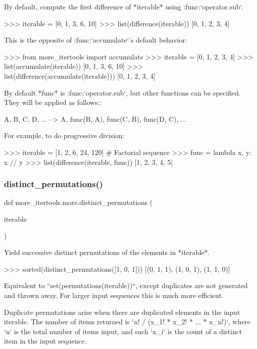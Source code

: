 \begin{DoxyVerb}By default, compute the first difference of *iterable* using
:func:`operator.sub`.

    >>> iterable = [0, 1, 3, 6, 10]
    >>> list(difference(iterable))
    [0, 1, 2, 3, 4]

This is the opposite of :func:`accumulate`'s default behavior:

    >>> from more_itertools import accumulate
    >>> iterable = [0, 1, 2, 3, 4]
    >>> list(accumulate(iterable))
    [0, 1, 3, 6, 10]
    >>> list(difference(accumulate(iterable)))
    [0, 1, 2, 3, 4]

By default *func* is :func:`operator.sub`, but other functions can be
specified. They will be applied as follows::

    A, B, C, D, ... --> A, func(B, A), func(C, B), func(D, C), ...

For example, to do progressive division:

    >>> iterable = [1, 2, 6, 24, 120]  # Factorial sequence
    >>> func = lambda x, y: x // y
    >>> list(difference(iterable, func))
    [1, 2, 3, 4, 5]\end{DoxyVerb}
 \mbox{\label{namespacemore__itertools_1_1more_af95310ce2a768acac94f5ae319f24b8f}} 
\subsubsection{\texorpdfstring{distinct\+\_\+permutations()}{distinct\_permutations()}}
{\footnotesize\ttfamily def more\+\_\+itertools.\+more.\+distinct\+\_\+permutations (\begin{DoxyParamCaption}\item[{}]{iterable }\end{DoxyParamCaption})}

\begin{DoxyVerb}Yield successive distinct permutations of the elements in *iterable*.

    >>> sorted(distinct_permutations([1, 0, 1]))
    [(0, 1, 1), (1, 0, 1), (1, 1, 0)]

Equivalent to ``set(permutations(iterable))``, except duplicates are not
generated and thrown away. For larger input sequences this is much more
efficient.

Duplicate permutations arise when there are duplicated elements in the
input iterable. The number of items returned is
`n! / (x_1! * x_2! * ... * x_n!)`, where `n` is the total number of
items input, and each `x_i` is the count of a distinct item in the input
sequence.\end{DoxyVerb}
 \mbox{\label{namespacemore__itertools_1_1more_a58e045549121b45641e6390fc65f3a28}} 
